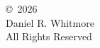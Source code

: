 \vspace*{\fill}
\begin{center}
\begin{singlespace}
\copyright\ 2026\\
Daniel R. Whitmore\\
All Rights Reserved
\end{singlespace}
\end{center}
\clearpage

